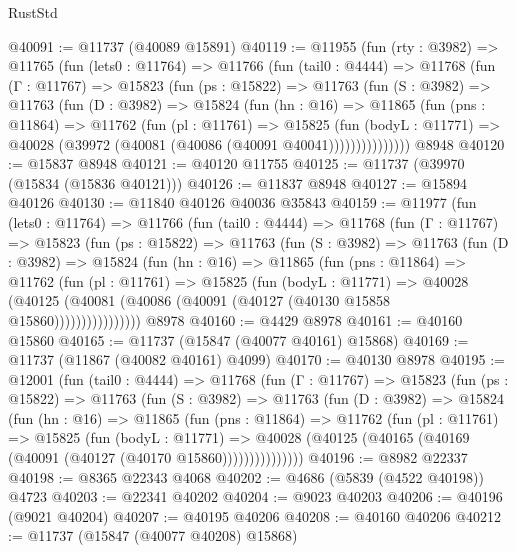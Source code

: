 \begin{lexlean}{RustStd}
\begin{coremodule}
@40091 := @11737 (@40089 @15891)
@40119 := @11955
    (fun (rty : @3982) =>
    @11765
      (fun (lets0 : @11764) =>
      @11766
        (fun (tail0 : @4444) =>
        @11768
          (fun (Γ : @11767) =>
          @15823
            (fun (ps : @15822) =>
            @11763
              (fun (S : @3982) =>
              @11763
                (fun (D : @3982) =>
                @15824
                  (fun (hn : @16) =>
                  @11865
                    (fun (pns : @11864) =>
                    @11762
                      (fun (pl : @11761) =>
                      @15825
                        (fun (bodyL : @11771) =>
                        @40028 (@39972 (@40081 (@40086 (@40091 @40041)))))))))))))))
    @8948
@40120 := @15837 @8948
@40121 := @40120 @11755
@40125 := @11737 (@39970 (@15834 (@15836 @40121)))
@40126 := @11837 @8948
@40127 := @15894 @40126
@40130 := @11840 @40126 @40036 @35843
@40159 := @11977
    (fun (lets0 : @11764) =>
    @11766
      (fun (tail0 : @4444) =>
      @11768
        (fun (Γ : @11767) =>
        @15823
          (fun (ps : @15822) =>
          @11763
            (fun (S : @3982) =>
            @11763
              (fun (D : @3982) =>
              @15824
                (fun (hn : @16) =>
                @11865
                  (fun (pns : @11864) =>
                  @11762
                    (fun (pl : @11761) =>
                    @15825
                      (fun (bodyL : @11771) =>
                      @40028
                        (@40125
                          (@40081 (@40086 (@40091 (@40127 (@40130 @15858 @15860))))))))))))))))
    @8978
@40160 := @4429 @8978
@40161 := @40160 @15860
@40165 := @11737 (@15847 (@40077 @40161) @15868)
@40169 := @11737 (@11867 (@40082 @40161) @4099)
@40170 := @40130 @8978
@40195 := @12001
    (fun (tail0 : @4444) =>
    @11768
      (fun (Γ : @11767) =>
      @15823
        (fun (ps : @15822) =>
        @11763
          (fun (S : @3982) =>
          @11763
            (fun (D : @3982) =>
            @15824
              (fun (hn : @16) =>
              @11865
                (fun (pns : @11864) =>
                @11762
                  (fun (pl : @11761) =>
                  @15825
                    (fun (bodyL : @11771) =>
                    @40028 (@40125 (@40165 (@40169 (@40091 (@40127 (@40170 @15860)))))))))))))))
@40196 := @8982 @22337
@40198 := @8365 @22343 @4068
@40202 := @4686 (@5839 (@4522 @40198)) @4723
@40203 := @22341 @40202
@40204 := @9023 @40203
@40206 := @40196 (@9021 @40204)
@40207 := @40195 @40206
@40208 := @40160 @40206
@40212 := @11737 (@15847 (@40077 @40208) @15868)

\end{coremodule}
\end{lexlean}
